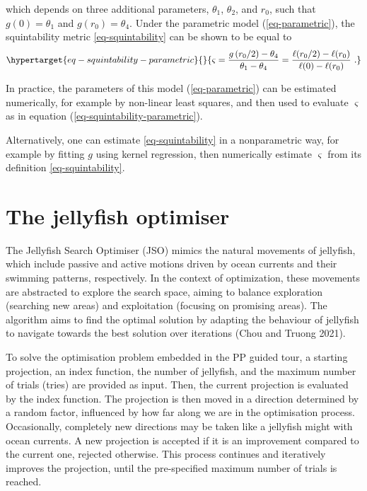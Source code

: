 \documentclass[
  12pt,
]{interact}
\theoremstyle{plain}
\begin{document}
which depends on three additional parameters, \(\theta_1\),
\(\theta_2\), and \(r_0\), such that \(g(0)=\theta_1\) and
\(g(r_0)=\theta_4\). Under the parametric model (\ref{eq-parametric}),
the squintability metric \eqref{eq-squintability} can be shown to be
equal to
\begin{equation}\protect\hypertarget{eq-squintability-parametric}{}{
\varsigma=\frac{g\left(r_{0}/2\right)-\theta_{4}}{\theta_{1}-\theta_{4}}=\frac{\ell(r_0/2)-\ell(r_0)}{\ell(0)-\ell(r_0)}\ .
}\label{eq-squintability-parametric}\end{equation}

In practice, the parameters of this model (\ref{eq-parametric}) can be
estimated numerically, for example by non-linear least squares, and then
used to evaluate \(\varsigma\) as in equation
(\ref{eq-squintability-parametric}).

Alternatively, one can estimate \eqref{eq-squintability} in a
nonparametric way, for example by fitting \(g\) using kernel regression,
then numerically estimate \(\varsigma\) from its definition
\eqref{eq-squintability}.

\hypertarget{sec-JSO}{%
\section{The jellyfish optimiser}\label{sec-JSO}}

The Jellyfish Search Optimiser (JSO) mimics the natural movements of
jellyfish, which include passive and active motions driven by ocean
currents and their swimming patterns, respectively. In the context of
optimization, these movements are abstracted to explore the search
space, aiming to balance exploration (searching new areas) and
exploitation (focusing on promising areas). The algorithm aims to find
the optimal solution by adapting the behaviour of jellyfish to navigate
towards the best solution over iterations (Chou and Truong 2021).

To solve the optimisation problem embedded in the PP guided tour, a
starting projection, an index function, the number of jellyfish, and the
maximum number of trials (tries) are provided as input. Then, the
current projection is evaluated by the index function. The projection is
then moved in a direction determined by a random factor, influenced by
how far along we are in the optimisation process. Occasionally,
completely new directions may be taken like a jellyfish might with ocean
currents. A new projection is accepted if it is an improvement compared
to the current one, rejected otherwise. This process continues and
iteratively improves the projection, until the pre-specified maximum
number of trials is reached.
\end{document}
